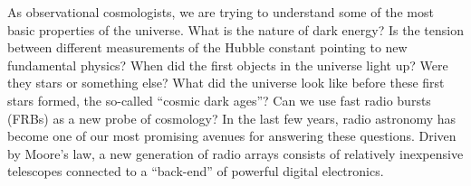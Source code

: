 \documentclass[letterpaper,11pt,preprint]{aastex}
\makeatletter
\renewcommand{\section}{\@startsection%
{section}{1}{0mm}{-\baselineskip}%
{0.5\baselineskip}{\normalfont\Large\bfseries}}%
\makeatother
\begin{document}

\singlespace





As observational cosmologists, we are trying to understand some of the
most basic properties of the universe.  What is the nature of dark
energy?  Is the tension between different measurements of the Hubble
constant pointing to new fundamental physics?  When did the first
objects in the universe light up?  Were they stars or something else?
What did the universe look like before these first stars formed, the
so-called ``cosmic dark ages''?  Can we use fast radio bursts (FRBs)
as a new probe of cosmology?  In the last few years, radio astronomy
has become one of our most promising avenues for answering these
questions.  Driven by Moore's law, a new generation of radio arrays
consists of relatively inexpensive telescopes connected to a
``back-end'' of powerful digital electronics.  
\end{document}
